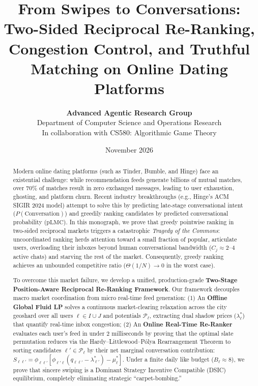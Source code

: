 \documentclass[11pt,letterpaper]{article}
\title{\textbf{\LARGE From Swipes to Conversations:}\\[0.4em]
\Large Two-Sided Reciprocal Re-Ranking, Congestion Control, and Truthful Matching on Online Dating Platforms}
\author{\textbf{Advanced Agentic Research Group} \\
\small Department of Computer Science and Operations Research \\
\small In collaboration with CS580: Algorithmic Game Theory}
\date{November 2026}
\theoremstyle{definition}
\theoremstyle{plain}
\theoremstyle{remark}
\begin{document}
\maketitle

\begin{abstract}
Modern online dating platforms (such as Tinder, Bumble, and Hinge) face an existential challenge: while recommendation feeds generate billions of mutual matches, over $70\%$ of matches result in zero exchanged messages, leading to user exhaustion, ghosting, and platform churn. Recent industry breakthroughs (e.g., Hinge's ACM SIGIR 2024 model) attempt to solve this by predicting late-stage conversational intent ($P(\text{Conversation})$) and greedily ranking candidates by predicted conversational probability ($\mathrm{pLMC}$). In this monograph, we prove that greedy pointwise ranking in two-sided reciprocal markets triggers a catastrophic \emph{Tragedy of the Commons}: uncoordinated ranking herds attention toward a small fraction of popular, articulate users, overloading their inboxes beyond human conversational bandwidth ($C_j \approx 2\text{--}4$ active chats) and starving the rest of the market. Consequently, greedy ranking achieves an unbounded competitive ratio ($\Theta(1/N) \to 0$ in the worst case).

To overcome this market failure, we develop a unified, production-grade \textbf{Two-Stage Position-Aware Reciprocal Re-Ranking Framework}. Our framework decouples macro market coordination from micro real-time feed generation:
(1) An \textbf{Offline Global Fluid LP} solves a continuous market-clearing relaxation across the city geoshard over all users $\ell \in I \cup J$ and potentials $\mathcal{P}_\ell$, extracting dual shadow prices ($\lambda_\ell^*$) that quantify real-time inbox congestion;
(2) An \textbf{Online Real-Time Re-Ranker} evaluates each user's feed in under $2$ milliseconds by proving that the optimal slate permutation reduces via the Hardy--Littlewood--P\'olya Rearrangement Theorem to sorting candidates $\ell' \in \mathcal{P}_\ell$ by their net marginal conversation contribution: $S_{\ell\ell'} = \phi_{\ell\ell'} [\phi_{\ell'\ell}(q_{\ell\ell'} - \lambda_{\ell'}^*) - \mu_\ell^*]$.
Under a finite daily like budget ($B_\ell \approx 8$), we prove that sincere swiping is a Dominant Strategy Incentive Compatible (DSIC) equilibrium, completely eliminating strategic ``carpet-bombing.''


\end{abstract}
\end{document}
